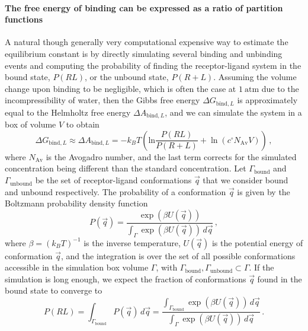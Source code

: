 \documentclass[9pt,bestpractices]{livecoms}
\begin{document}
\paragraph{The free energy of binding can be expressed as a ratio of partition functions}
A natural though generally very computational expensive way to estimate the equilibrium constant is by directly simulating several binding and unbinding events and computing the probability of finding the receptor-ligand system in the bound state, $P(RL)$, or the unbound state, $P(R+L)$.
Assuming the volume change upon binding to be negligible, which is often the case at $1~\mathrm{atm}$ due to the incompressibility of water, then the Gibbs free energy $\Delta G_{\mathrm{bind}, L}$ is approximately equal to the Helmholtz free energy $\Delta A_{\mathrm{bind}, L}$, and we can simulate the system in a box of volume $V$ to obtain~\cite{jong_determining_2011}
\begin{equation}\label{eq:binding-free-energy-from-bound-unbound-probability-ratio}
    \Delta G_{\mathrm{bind},L} \approx \Delta A_{\mathrm{bind}, L} = - k_B T  \left( \mathrm{ln} \frac{P(RL)}{P(R+L)} + \ln \left( c^\circ N_{\mathrm{Av}} V \right) \right) \, ,
\end{equation}
where $N_{\mathrm{Av}}$ is the Avogadro number, and the last term corrects for the simulated concentration being different than the standard concentration.
Let $\Gamma_{\mathrm{bound}}$ and $\Gamma_{\mathrm{unbound}}$ be the set of receptor-ligand conformations $\vec{q}$ that we consider bound and unbound respectively.
The probability of a conformation $\vec{q}$ is given by the Boltzmann probability density function
\begin{equation}
    P(\vec{q}) = \frac{\exp\left( \beta U(\vec{q}) \right)}{\int_{\Gamma} \exp\left( \beta U(\vec{q}) \right) \, d\vec{q}} \, ,
\end{equation}
where $\beta = (k_B T)^{-1}$ is the inverse temperature, $U(\vec{q})$ is the potential energy of conformation $\vec{q}$, and the integration is over the set of all possible conformations accessible in the simulation box volume $\Gamma$, with $\Gamma_{\mathrm{bound}},\Gamma_{\mathrm{unbound}} \subset \Gamma$.
If the simulation is long enough, we expect the fraction of conformations $\vec{q}$ found in the bound state to converge to
\begin{equation}
    P(RL) = \int_{\Gamma_{\mathrm{bound}}} P(\vec{q}) \, d\vec{q} = \frac{\int_{\Gamma_{\mathrm{bound}}} \exp\left( \beta U(\vec{q}) \right) \, d\vec{q}}{\int_{\Gamma} \exp\left( \beta U(\vec{q}) \right) \, d\vec{q}} \, .
\end{equation}
\end{document}
